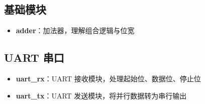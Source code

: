 
\subsection{基础模块}

\begin{itemize}
    \item \textbf{adder}：加法器，理解组合逻辑与位宽
\end{itemize}

\subsection{UART 串口}

\begin{itemize}
    \item \textbf{uart\_rx}：UART 接收模块，处理起始位、数据位、停止位
    \item \textbf{uart\_tx}：UART 发送模块，将并行数据转为串行输出
\end{itemize}
